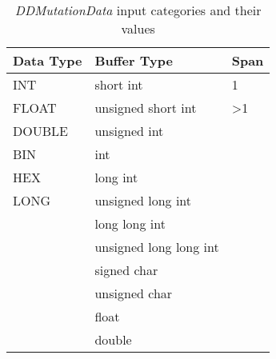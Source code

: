 \begin{table}[h]
  \scriptsize
  \centering
  \caption{\emph{DDMutationData} input categories and their values}
  \label{table:ddmutation2_categories}
\begin{tabular}{@{}lll@{}}
\toprule
\textbf{Data Type} & \textbf{Buffer Type}   & \textbf{Span}   \\ \midrule
INT                & short int              & 1               \\
FLOAT              & unsigned short int     & \textgreater{}1 \\
DOUBLE             & unsigned int           &                 \\
BIN                & int                    &                 \\
HEX                & long int               &                 \\
LONG               & unsigned long int      &                 \\
                   & long long int          &                 \\
                   & unsigned long long int &                 \\
                   & signed char            &                 \\
                   & unsigned char          &                 \\
                   & float                  &                 \\
                   & double                 &                 \\ \bottomrule
\end{tabular}
\end{table}
